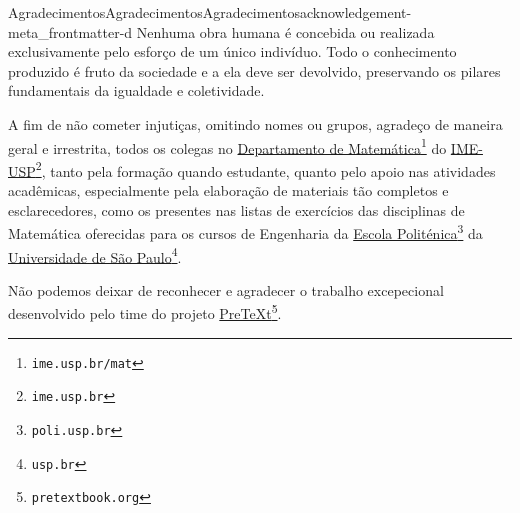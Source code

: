 \documentclass[oneside,10pt,]{book}
\numberwithin{equation}{section}
\begin{document}
\clearpage
%
%
\typeout{************************************************}
\typeout{************************************************}
%
\begin{acknowledgement}{Agradecimentos}{Agradecimentos}{}{Agradecimentos}{}{}{acknowledgement-meta_frontmatter-d}
Nenhuma obra humana é concebida ou realizada exclusivamente pelo esforço de um único indivíduo. Todo o conhecimento produzido é fruto da sociedade e a ela deve ser devolvido, preservando os pilares fundamentais da igualdade e coletividade.%
\par
A fim de não cometer injutiças, omitindo nomes ou grupos, agradeço de maneira geral e irrestrita, todos os colegas no \href{https://www.ime.usp.br/mat}{Departamento de Matemática}\footnote{\nolinkurl{ime.usp.br/mat}\label{fn-meta_frontmatter-d-b-b}} do \href{https://www.ime.usp.br}{IME-USP}\footnote{\nolinkurl{ime.usp.br}\label{fn-meta_frontmatter-d-b-d}}, tanto pela formação quando estudante, quanto pelo apoio nas atividades acadêmicas, especialmente pela elaboração de materiais tão completos e esclarecedores, como os presentes nas listas de exercícios das disciplinas de Matemática oferecidas para os cursos de Engenharia da \href{https://www.poli.usp.br}{Escola Politénica}\footnote{\nolinkurl{poli.usp.br}\label{fn-meta_frontmatter-d-b-f}} da \href{}{Universidade de São Paulo}\footnote{\nolinkurl{usp.br}\label{fn-meta_frontmatter-d-b-h}}.%
\par
Não podemos deixar de reconhecer e agradecer o trabalho excepecional desenvolvido pelo time do projeto \href{https://pretextbook.org}{PreTeXt}\footnote{\nolinkurl{pretextbook.org}\label{fn-meta_frontmatter-d-c-b}}.%
\end{acknowledgement}
%
%
\typeout{************************************************}
\typeout{************************************************}
%
\end{document}
